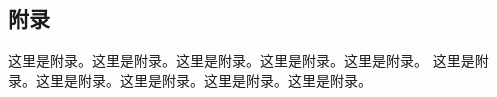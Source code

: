 
\newpage


\begin{appendices}
    \renewcommand{\thesection}{\Alph{section}}
    \section{附录}
    这里是附录。这里是附录。这里是附录。这里是附录。这里是附录。
    这里是附录。这里是附录。这里是附录。这里是附录。这里是附录。







\end{appendices}
